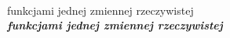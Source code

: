 \documentclass[a4paper,11pt]{article}
\begin{document}
\noindent
{} \\
\Jest  funkcjami jednej zmiennej rzeczywistej \\
\Powin \textbf{\textit{funkcjami jednej zmiennej rzeczywistej}} \\

\vspace{\spaceTwo}

























\end{document}
